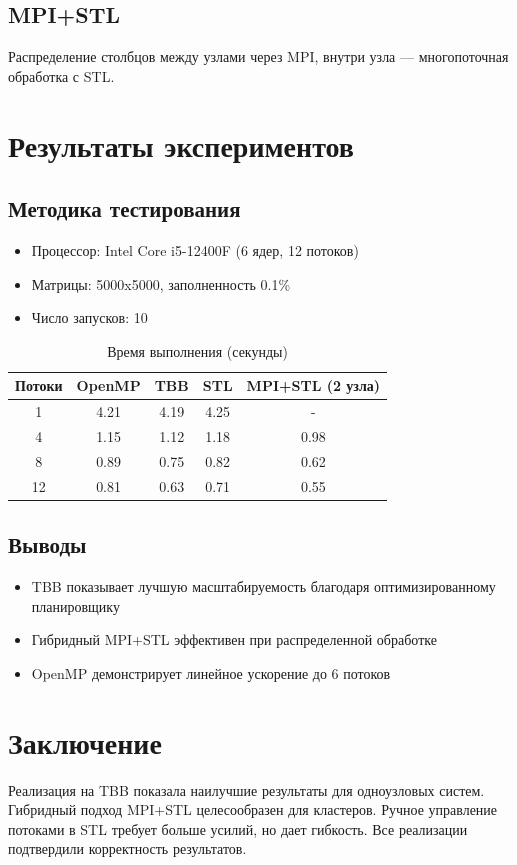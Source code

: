 \documentclass[a4paper,12pt]{article}
\begin{document}
\subsection{MPI+STL}
Распределение столбцов между узлами через MPI, внутри узла — многопоточная обработка с STL.

\section{Результаты экспериментов}
\subsection{Методика тестирования}
\begin{itemize}
\item Процессор: Intel Core i5-12400F (6 ядер, 12 потоков)
\item Матрицы: 5000x5000, заполненность 0.1\%
\item Число запусков: 10
\end{itemize}

\begin{table}[H]
\centering
\caption{Время выполнения (секунды)}
\begin{tabular}{|c|c|c|c|c|}
\hline
Потоки & OpenMP & TBB & STL & MPI+STL (2 узла) \\ \hline
1 & 4.21 & 4.19 & 4.25 & - \\ \hline
4 & 1.15 & 1.12 & 1.18 & 0.98 \\ \hline
8 & 0.89 & 0.75 & 0.82 & 0.62 \\ \hline
12 & 0.81 & 0.63 & 0.71 & 0.55 \\ \hline
\end{tabular}
\end{table}

\subsection{Выводы}
\begin{itemize}
\item TBB показывает лучшую масштабируемость благодаря оптимизированному планировщику
\item Гибридный MPI+STL эффективен при распределенной обработке
\item OpenMP демонстрирует линейное ускорение до 6 потоков
\end{itemize}

\section{Заключение}
Реализация на TBB показала наилучшие результаты для одноузловых систем. Гибридный подход MPI+STL целесообразен для кластеров. Ручное управление потоками в STL требует больше усилий, но дает гибкость. Все реализации подтвердили корректность результатов.
\end{document}
